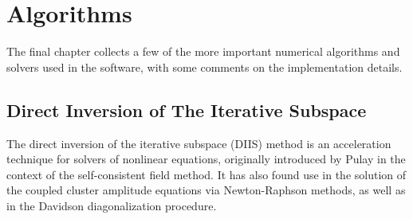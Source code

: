 \chapter{Algorithms}

The final chapter collects a few of the more important numerical algorithms and solvers used in the \mchem{} software, with some comments on the implementation details.

\section{Direct Inversion of The Iterative Subspace \label{sec:DIIS}}

The direct inversion of the iterative subspace (DIIS) method is an acceleration technique for solvers of nonlinear equations, originally introduced by Pulay \cite{Pul1980} in the context of the self-consistent field method. It has also found use in the solution of  the coupled cluster amplitude equations via Newton-Raphson methods, as well as in the Davidson diagonalization procedure. 

